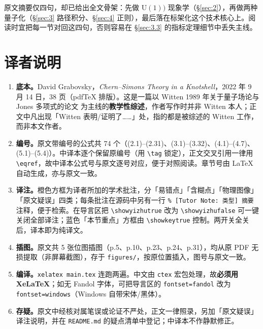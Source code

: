 \begin{abstract}
\noindent
在这篇教学性综述中，我们介绍并研究一种被称为陈--西蒙斯理论的三维拓扑场论。我们从 $\mathrm{U}(1))$ 作用量的现象学出发：讨论它的经典运动方程、它的量子化以及它的可观测对象。随后我们转向非阿贝尔理论，分别用路径积分与正则两种形式处理它。我们尤其关注流形与纽结的标架化，以及量子理论的几何结构。
\end{abstract}

\begin{yizhu}[物理图像]
原文摘要仅四句，却已给出全文骨架：先做 $\mathrm{U}(1))$ 现象学（\S\ref{sec:2}），再做两种量子化（\S\ref{sec:3} 路径积分、\S\ref{sec:4} 正则），最后落在标架化这个技术核心上。阅读时宜把每一节对回这四句，否则容易在 \S\ref{sec:3.3} 的指标定理细节中丢失主线。
\end{yizhu}

\section*{译者说明}

\begin{enumerate}[leftmargin=1.6em,itemsep=4pt,topsep=4pt]
  \item \textbf{底本。}David Grabovsky，\emph{Chern--Simons Theory in a Knotshell}，2022 年 9 月 14 日，38 页（pdf\TeX{} 排版）。这是一篇以 Witten 1989 年关于量子场论与 Jones 多项式的论文 \cite{witten1989} 为主线的\textbf{教学性综述}，作者写作时并非 Witten 本人；正文中凡出现「Witten 表明/证明了……」处，指的都是被综述的 Witten 工作，而非本文作者。
  \item \textbf{编号。}原文带编号的公式共 74 个（(2.1)--(2.31)、(3.1)--(3.32)、(4.1)--(4.7)、(5.1)--(5.4)）。中译本逐个保留原编号（用 \verb|\tag| 锁定），正文交叉引用一律用 \verb|\eqref|，故中译本公式号与原文逐号对应，便于对照阅读。章节号由 \LaTeX{} 自动生成，亦与原文一致。
  \item \textbf{译注。}橙色方框为译者所加的学术批注，分「易错点」「含糊点」「物理图像」「原文疑误」四类；每条批注在源码中另有一行 \verb|% [Tutor Note: 类型] 摘要| 注释，便于检索。在导言区把 \verb|\showyizhutrue| 改为 \verb|\showyizhufalse| 可一键关闭全部译注；蓝色「本节重点」方框由 \verb|\showkeytrue| 控制。两开关全关后，译本即为纯译文。
  \item \textbf{插图。}原文共 5 张位图插图（p.5、p.10、p.23、p.24、p.31），均从原 PDF 无损提取（非屏幕截图），存于 \verb|figures/|，按原位置插入，图号与原文一致。
  \item \textbf{编译。}\verb|xelatex main.tex| 连跑两遍。中文由 \verb|ctex| 宏包处理，故\textbf{必须用 Xe\LaTeX}；如无 Fandol 字体，可把导言区的 \verb|fontset=fandol| 改为 \verb|fontset=windows|（Windows 自带宋体/黑体）。
  \item \textbf{存疑。}原文中经核对属笔误或论证不严处，正文一律照录，另加「原文疑误」译注说明，并在 \verb|README.md| 的疑点清单中登记；中译本不作静默修正。
\end{enumerate}

\newpage
\tableofcontents
\newpage
